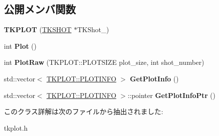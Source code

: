\subsection*{公開メンバ関数}
\begin{DoxyCompactItemize}
\item 
\mbox{\label{class_t_k_p_l_o_t_aeb9168bcf7e45c45fc38dab63e6b90b3}} 
{\bfseries T\+K\+P\+L\+OT} (\hyperlink{class_t_k_s_h_o_t}{T\+K\+S\+H\+OT} $\ast$T\+K\+Shot\+\_\+)
\item 
\mbox{\label{class_t_k_p_l_o_t_a04c574cd562f4e2c4f0f004a745bba90}} 
int {\bfseries Plot} ()
\item 
\mbox{\label{class_t_k_p_l_o_t_abae6994f9c17d0806a9ce802fdcd67a3}} 
int {\bfseries Plot\+Raw} (T\+K\+P\+L\+O\+T\+::\+P\+L\+O\+T\+S\+I\+ZE plot\+\_\+size, int shot\+\_\+number)
\item 
\mbox{\label{class_t_k_p_l_o_t_a5ddc4ef2a68d8649cfb2aebf507121fd}} 
std\+::vector$<$ \hyperlink{struct_t_k_p_l_o_t_1_1_p_l_o_t_i_n_f_o}{T\+K\+P\+L\+O\+T\+::\+P\+L\+O\+T\+I\+N\+FO} $>$ {\bfseries Get\+Plot\+Info} ()
\item 
\mbox{\label{class_t_k_p_l_o_t_a4087cc1a73e760ac8eb32cbdf78a4433}} 
std\+::vector$<$ \hyperlink{struct_t_k_p_l_o_t_1_1_p_l_o_t_i_n_f_o}{T\+K\+P\+L\+O\+T\+::\+P\+L\+O\+T\+I\+N\+FO} $>$\+::pointer {\bfseries Get\+Plot\+Info\+Ptr} ()
\end{DoxyCompactItemize}


このクラス詳解は次のファイルから抽出されました\+:\begin{DoxyCompactItemize}
\item 
tkplot.\+h\end{DoxyCompactItemize}

